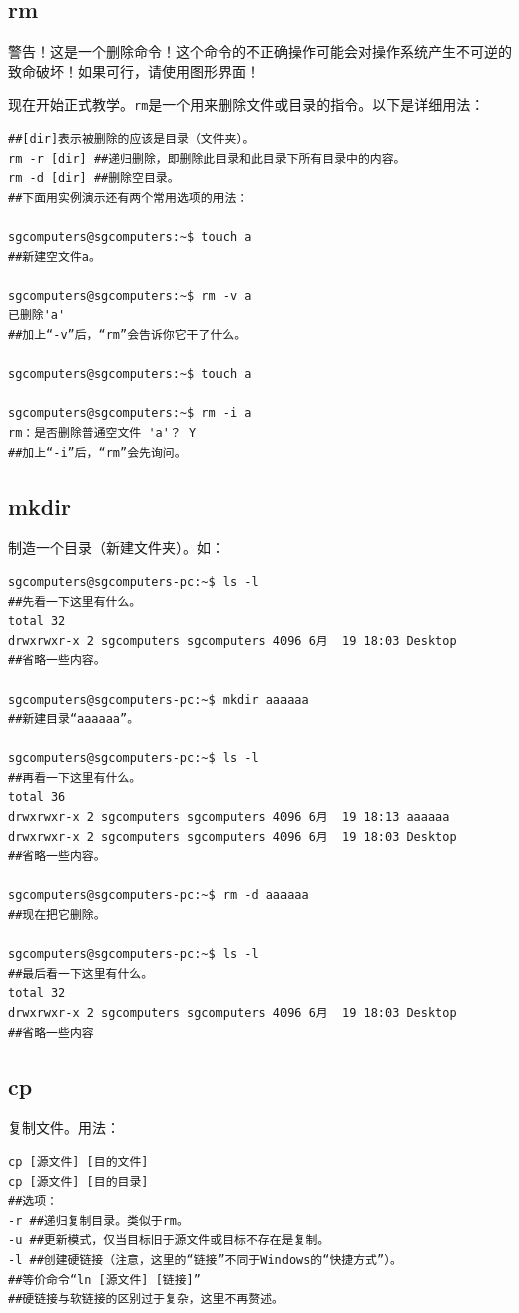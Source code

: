 \subsection{rm}
{\color{red}警告！这是一个删除命令！这个命令的不正确操作可能会对操作系统产生不可逆的致命破坏！如果可行，请使用图形界面！}\par
\cite{manrm} 现在开始正式教学。\verb|rm|是一个用来删除文件或目录的指令。以下是详细用法：
\begin{verbatim}
##[dir]表示被删除的应该是目录（文件夹）。
rm -r [dir] ##递归删除，即删除此目录和此目录下所有目录中的内容。
rm -d [dir] ##删除空目录。
##下面用实例演示还有两个常用选项的用法：

sgcomputers@sgcomputers:~$ touch a
##新建空文件a。

sgcomputers@sgcomputers:~$ rm -v a
已删除'a'
##加上“-v”后，“rm”会告诉你它干了什么。

sgcomputers@sgcomputers:~$ touch a

sgcomputers@sgcomputers:~$ rm -i a
rm：是否删除普通空文件 'a'？ Y
##加上“-i”后，“rm”会先询问。

\end{verbatim}
\subsection{mkdir}
制造一个目录（新建文件夹）。如：
\begin{verbatim}
sgcomputers@sgcomputers-pc:~$ ls -l
##先看一下这里有什么。
total 32
drwxrwxr-x 2 sgcomputers sgcomputers 4096 6月  19 18:03 Desktop
##省略一些内容。

sgcomputers@sgcomputers-pc:~$ mkdir aaaaaa
##新建目录“aaaaaa”。

sgcomputers@sgcomputers-pc:~$ ls -l
##再看一下这里有什么。
total 36
drwxrwxr-x 2 sgcomputers sgcomputers 4096 6月  19 18:13 aaaaaa
drwxrwxr-x 2 sgcomputers sgcomputers 4096 6月  19 18:03 Desktop
##省略一些内容。

sgcomputers@sgcomputers-pc:~$ rm -d aaaaaa
##现在把它删除。

sgcomputers@sgcomputers-pc:~$ ls -l
##最后看一下这里有什么。
total 32
drwxrwxr-x 2 sgcomputers sgcomputers 4096 6月  19 18:03 Desktop
##省略一些内容
\end{verbatim}
\subsection{cp}
复制文件。用法：
\begin{verbatim}
cp [源文件] [目的文件]
cp [源文件] [目的目录]
##选项：
-r ##递归复制目录。类似于rm。
-u ##更新模式，仅当目标旧于源文件或目标不存在是复制。
-l ##创建硬链接（注意，这里的“链接”不同于Windows的“快捷方式”）。
##等价命令“ln [源文件] [链接]”
##硬链接与软链接的区别过于复杂，这里不再赘述。
\end{verbatim}
